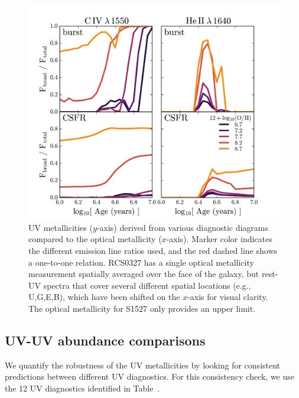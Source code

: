 \begin{figure}
  \begin{center}
    \includegraphics[width=\linewidth]{figs/f7.png}
    \caption{UV metallicities ($y$-axis) derived from various diagnostic diagrams compared to the optical metallicity ($x$-axis). Marker color indicates the different emission line ratios used, and the red dashed line shows a one-to-one relation. RCS0327 has a single optical metallicity measurement spatially averaged over the face of the galaxy, but rest-UV spectra that cover several different spatial locations (e.g., U,G,E,B), which have been shifted on the $x$-axis for visual clarity. The optical metallicity for S1527 only provides an upper limit.}
    \label{fig:UVZ}
  \end{center}
\end{figure}

\subsection{UV-UV abundance comparisons}\label{sec:ZZ:UV}

We quantify the robustness of the UV metallicities by looking for consistent predictions between different UV diagnostics. For this consistency check, we use the 12 UV diagnostics identified in Table~\XXX.

